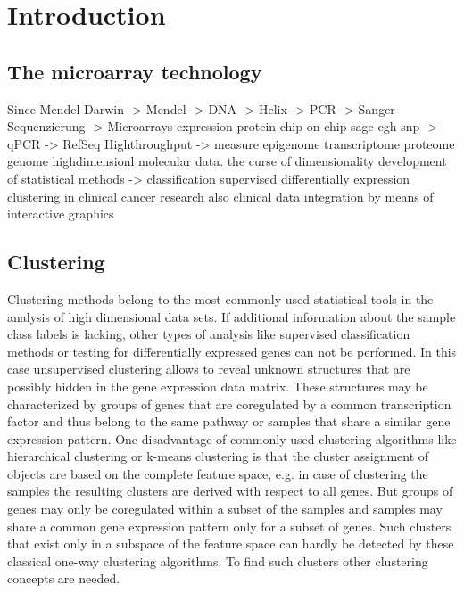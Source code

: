 \chapter{Introduction}

\section{The microarray technology}
Since Mendel 
Darwin -> Mendel -> DNA -> Helix -> PCR -> Sanger Sequenzierung -> Microarrays expression protein chip on chip sage cgh snp -> qPCR -> RefSeq Highthroughput -> measure epigenome transcriptome proteome genome
highdimensionl molecular data.
the curse of dimensionality
development of statistical methods  -> classification supervised differentially expression clustering
in clinical cancer research also clinical data
integration by means of interactive graphics

\section{Clustering} %
Clustering methods belong to the most commonly used statistical tools in the analysis of high dimensional data sets. If additional information about the sample class labels is lacking, other types of analysis like supervised classification methods or testing for differentially expressed genes can not be performed. In this case unsupervised clustering allows to reveal unknown structures that are possibly hidden in the gene expression data matrix. These structures may be characterized by groups of genes that are coregulated by a common transcription factor and thus belong to the same pathway or samples that share a similar gene expression pattern. 
One disadvantage of commonly used clustering algorithms like hierarchical clustering or k-means clustering is that the cluster assignment of objects are based on the complete feature space, e.g. in case of clustering the samples the resulting clusters are derived with respect to all genes. 
But groups of genes may only be coregulated within a subset of the samples and samples may share a common gene expression pattern only for a subset of genes. Such clusters that exist only in a subspace of the feature space can hardly be detected by these classical one-way clustering algorithms.
To find such clusters other clustering concepts are needed. 

